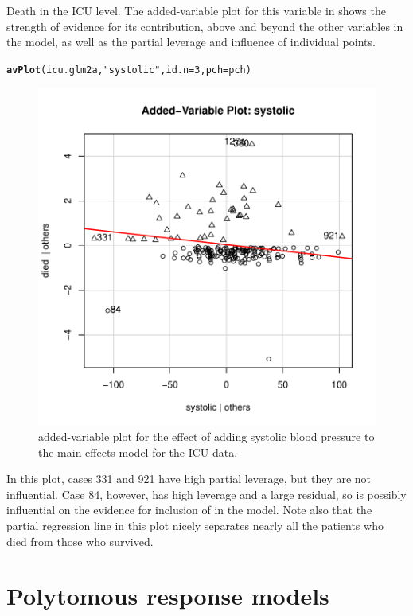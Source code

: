 \documentclass[11pt]{book}\usepackage[]{graphicx}\usepackage[]{color}
\makeatletter
\newcommand{\hlnum}[1]{\textcolor[rgb]{0.686,0.059,0.569}{#1}}%
\newcommand{\hlstr}[1]{\textcolor[rgb]{0.192,0.494,0.8}{#1}}%
\newcommand{\hlstd}[1]{\textcolor[rgb]{0.345,0.345,0.345}{#1}}%
\newcommand{\hlkwc}[1]{\textcolor[rgb]{0.333,0.667,0.333}{#1}}%
\newcommand{\hlkwd}[1]{\textcolor[rgb]{0.737,0.353,0.396}{\textbf{#1}}}%
\newenvironment{kframe}{%
 \def\at@end@of@kframe{}%
 \ifinner\ifhmode%
  \def\at@end@of@kframe{\end{minipage}}%
  \begin{minipage}{\columnwidth}%
 \fi\fi%
 \def\FrameCommand##1{\hskip\@totalleftmargin \hskip-\fboxsep
 \colorbox{shadecolor}{##1}\hskip-\fboxsep
     \hskip-\linewidth \hskip-\@totalleftmargin \hskip\columnwidth}%
 \MakeFramed {\advance\hsize-\width
   \@totalleftmargin\z@ \linewidth\hsize
   \@setminipage}}%
 {\par\unskip\endMakeFramed%
 \at@end@of@kframe}
\newenvironment{knitrout}{}{} %
\renewenvironment{knitrout}{\small\renewcommand{\baselinestretch}{.85}}{} %
\makeatother
\begin{document}
\begin{Example}[icu3]{Death in the ICU}
level.  The added-variable plot for this variable in 
shows the strength of evidence for its contribution, above and beyond the other variables
in the model, as well as the partial leverage and influence of individual points.
\begin{knitrout}
\color{fgcolor}\begin{kframe}
\begin{alltt}
\hlkwd{avPlot}\hlstd{(icu.glm2a,} \hlstr{"systolic"}\hlstd{,} \hlkwc{id.n}\hlstd{=}\hlnum{3}\hlstd{,} \hlkwc{pch}\hlstd{=pch)}
\end{alltt}
\end{kframe}\begin{figure}[!htbp]


\centerline{\includegraphics[width=.6\textwidth]{ch07/fig/icu3-avp2-1} }

\caption[added-variable plot for the effect of adding systolic blood pressure to the main effects model for the ICU data]{added-variable plot for the effect of adding systolic blood pressure to the main effects model for the ICU data.\label{fig:icu3-avp2}}
\end{figure}


\end{knitrout}
In this plot, cases 331 and 921 have high partial leverage, but they are not influential.
Case 84, however, has high leverage and a large residual, so is possibly influential on the
evidence for inclusion of  in the model.
Note also that the partial regression line in this plot nicely separates nearly all the patients who died
from those who survived.

\end{Example}

\section{Polytomous response models}\label{sec:logist-poly}
\end{document}
